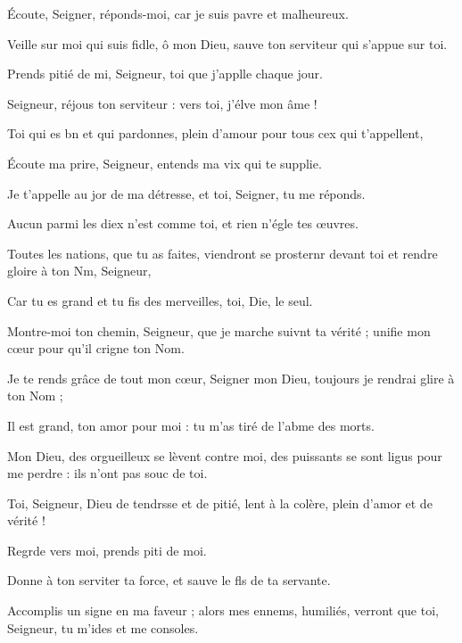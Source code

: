 \item Écoute, Seigner, réponds-moi,\psstar{} car je suis pavre et malheureux.
\item Veille sur moi qui suis fidle, ô mon Dieu,\psstar{} sauve ton serviteur qui s’appue sur toi.
\item Prends pitié de mi, Seigneur,\psstar{} toi que j’applle chaque jour.
\item Seigneur, réjous ton serviteur :\psstar{} vers toi, j’élve mon âme !
\item Toi qui es bn et qui pardonnes,\psstar{} plein d’amour pour tous cex qui t’appellent,
\item Écoute ma prire, Seigneur,\psstar{} entends ma vix qui te supplie.
\item Je t’appelle au jor de ma détresse,\psstar{} et toi, Seigner, tu me réponds.
\item Aucun parmi les diex n’est comme toi,\psstar{} et rien n’égle tes œuvres.
\item Toutes les nations, que tu as faites, viendront se prosternr devant toi\psstar{} et rendre gloire à ton Nm, Seigneur,
\item Car tu es grand et tu fis des merveilles,\psstar{} toi, Die, le seul.
\item Montre-moi ton chemin, Seigneur,\pscross{} que je marche suivnt ta vérité ;\psstar{} unifie mon cœur pour qu’il crigne ton Nom.
\item Je te rends grâce de tout mon cœur, Seigner mon Dieu,\psstar{} toujours je rendrai glire à ton Nom ;
\item Il est grand, ton amor pour moi :\psstar{} tu m’as tiré de l’abme des morts.
\item Mon Dieu, des orgueilleux se lèvent contre moi,\pscross{} des puissants se sont ligus pour me perdre :\psstar{} ils n’ont pas souc de toi.
\item Toi, Seigneur, Dieu de tendrsse et de pitié,\psstar{} lent à la colère, plein d’amor et de vérité !
\item Regrde vers moi,\psstar{} prends piti de moi.
\item Donne à ton serviter ta force,\psstar{} et sauve le fls de ta servante.
\item Accomplis un signe en ma faveur ;\pscross{} alors mes ennems, humiliés,\psstar{} verront que toi, Seigneur, tu m’ides et me consoles.